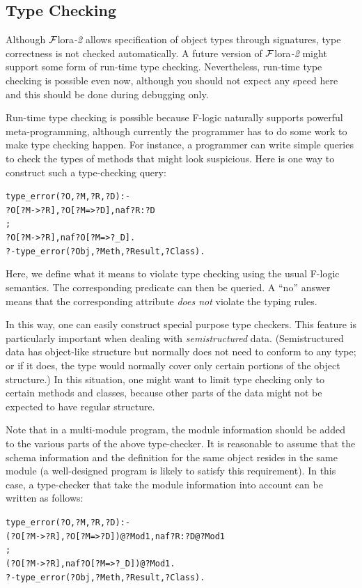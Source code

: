 \documentclass[11pt]{article}
\newcommand{\FLORA}{{\mbox{\sc ${\cal F}${lora}\rm\emph{-2}}}\xspace}
\newcommand{\fl}{\mbox{F-logic}\xspace}
\newcommand{\SILKNAF}{{{\tt naf}}\xspace}
\begin{document}
\subsection{Type Checking}\label{sec-typechecking}

Although \FLORA allows specification of object types through signatures,
type correctness is not checked automatically.
A future version of \FLORA might support some form of run-time type
checking. Nevertheless, run-time type checking is possible even now,
although you should not expect any speed here and this should be done
during debugging only.

Run-time type checking is possible because \fl naturally supports powerful
meta-programming, although currently the programmer has to do some work to
make type checking happen.  For instance, a programmer can write simple
queries to check the types of methods that might look suspicious.  Here is
one way to construct such a type-checking query:
\begin{alltt}
type_error(?O,?M,?R,?D) :-
       ?O[?M->?R], ?O[?M=>?D], \SILKNAF ?R:?D
       ;
       ?O[?M->?R], \SILKNAF ?O[?M=>?_D].
?- type_error(?Obj,?Meth,?Result,?Class).
\end{alltt}
Here, we define what it means to violate type checking using the usual
\fl semantics. The corresponding predicate can then be queried. A
``no'' answer means that the corresponding attribute \emph{does not}
violate the typing rules.

In this way, one can easily construct special purpose type checkers.  This
feature is particularly important when dealing with \emph{semistructured}
data. (Semistructured data has object-like structure but normally does not
need to conform to any type; or if it does, the type would normally cover
only certain portions of the object structure.) In this situation, one
might want to limit type checking only to certain methods and classes,
because other parts of the data might not be expected to have regular
structure.

Note that in a multi-module program, the module information should be added
to the various parts of the above type-checker. It is reasonable to assume
that the schema information and the definition for the same object
resides in the same module (a well-designed program is likely to satisfy
this requirement). In this case, a type-checker that take the module
information into account can be written as follows:
\begin{alltt}
type_error(?O,?M,?R,?D) :-
       (?O[?M->?R], ?O[?M=>?D])@?Mod1, \SILKNAF ?R:?D@?Mod1
       ;
       (?O[?M->?R], \SILKNAF ?O[?M=>?_D])@?Mod1.
?- type_error(?Obj,?Meth,?Result,?Class).
\end{alltt}
\end{document}
